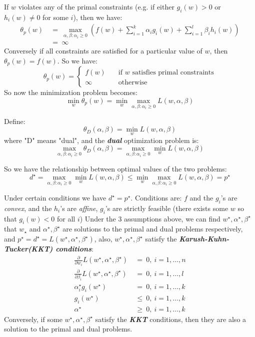 \documentclass{article}
\begin{document}
If $w$ violates any of the primal constraints (e.g. if either $g_i(w)>0$ or $h_i(w)\neq0$ for some $i$), then we have:
\begin{align*}
\theta_p(w)\ &=\ \max_{\alpha,\beta:\alpha_i\geq0}\left(f(w)+\sum_{i=1}^k\alpha_ig_i(w)+\sum_{i=1}^l\beta_ih_i(w)\right) \\
             &=\ \infty
\end{align*}
Conversely if all constraints are satisfied for a particular value of $w$, then $\theta_p(w)=f(w)$.
So we have:
\begin{equation*}
\theta_p(w)=\begin{cases}
f(w)\quad &\text{if $w$ satisfies primal constraints} \\
\infty    &\text{otherwise}
\end{cases}
\end{equation*}
So now the minimization problem becomes:
\begin{equation*}
\min_w\theta_p(w)=\min_w\max_{\alpha,\beta:\alpha_i\geq0}L(w,\alpha,\beta)
\end{equation*}

Define:
\begin{equation*}
\theta_D(\alpha,\beta)=\min_wL(w,\alpha,\beta)
\end{equation*}
where "D" means "dual", and the \emph{\textbf{dual}} optimization problem is:
\begin{equation*}
\max_{\alpha,\beta:\alpha_i\geq0}\theta_D(\alpha,\beta)=\max_{\alpha,\beta:\alpha_i\geq0}\min_wL(w,\alpha,\beta)
\end{equation*}

So we have the relationship between optimal values of the two problems:
\begin{equation*}
d^\star=\max_{\alpha,\beta:\alpha_i\geq0}\min_wL(w,\alpha,\beta)\leq \min_w\max_{\alpha,\beta:\alpha_i\geq0}L(w,\alpha,\beta)=p^\star
\end{equation*}

Under certain conditions we have $d^\star=p^\star$. 
Conditions are: $f$ and the $g_i$'s are \emph{convex}, and the $h_i$'s are \emph{affine}, $g_i$'s are strictly feasible (there exists some $w$ so that $g_i(w)<0$ for all $i$)
Under the 3 assumptions above, we can find $w^\star,\alpha^\star,\beta^\star$ that $w_\star$ and $\alpha^\star,\beta^\star$ are solutions to the primal and dual problems respectively, and $p^\star=d^\star=L(w^\star,\alpha^\star,\beta^\star)$, also, $w^\star,\alpha^\star,\beta^\star$ satisfy the \emph{\textbf{Karush-Kuhn-Tucker(KKT) conditions}}:
\begin{align*}
\frac{\partial}{\partial w_i}L(w^\star,\alpha^\star,\beta^\star)\ &=\ 0,\ i=1,\ldots,n \\
\frac{\partial}{\partial \beta_i}L(w^\star,\alpha^\star,\beta^\star)\ &=\ 0,\ i=1,\ldots,l \\
\alpha_i^\star g_i(w^\star)\ &=\ 0,\ i=1,\ldots,k \\
g_i(w^\star)\ &\leq\ 0,\ i=1,\ldots,k \\
\alpha^\star\ &\geq\ 0,\ i=1,\ldots,k
\end{align*}
Conversely, if some $w^\star,\alpha^\star,\beta^\star$ satisfy the \emph{\textbf{KKT}} conditions, then they are also a solution to the primal and dual problems.
\end{document}
